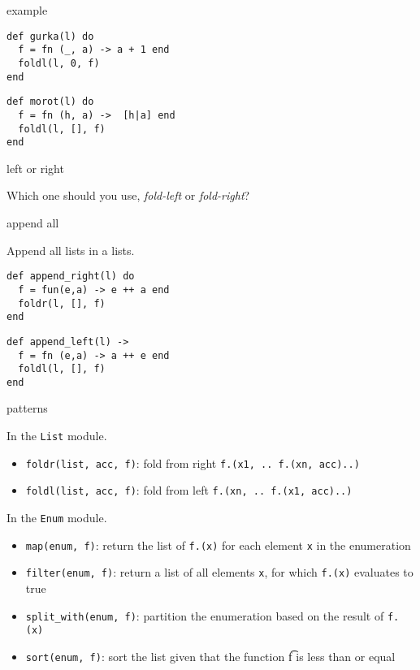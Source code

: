 \begin{frame}[fragile]{example}

\pause\vspace{10pt}
\begin{verbatim}
def gurka(l) do
  f = fn (_, a) -> a + 1 end
  foldl(l, 0, f)
end
\end{verbatim}
\pause 
\begin{verbatim}
def morot(l) do
  f = fn (h, a) ->  [h|a] end
  foldl(l, [], f)
end
\end{verbatim}
\end{frame}

\begin{frame}{left or right}

Which one should you use, {\em fold-left} or {\em fold-right}?

\end{frame}

\begin{frame}[fragile]{append all}

\pause Append all lists in a lists.

\vspace{20pt}

\begin{verbatim}
def append_right(l) do
  f = fun(e,a) -> e ++ a end
  foldr(l, [], f)
end
\end{verbatim}
\pause
\begin{verbatim}
def append_left(l) ->
  f = fn (e,a) -> a ++ e end
  foldl(l, [], f)
end
\end{verbatim}

\end{frame}



\begin{frame}{patterns}

In the {\tt List} module. 

\begin{itemize}
\item {\tt foldr(list, acc, f)}: fold from right  {\tt f.(x1, .. f.(xn, acc)..) }
\item {\tt foldl(list, acc, f)}: fold from left  {\tt f.(xn, .. f.(x1, acc)..) }
\end{itemize}

\vspace{10pt}\pause
In the {\tt Enum} module. 
\begin{itemize}
\item {\tt map(enum, f)}: return the list of {\tt f.(x)} for each element {\tt x} in the enumeration
\pause 
\item {\tt filter(enum, f)}: return a list of all elements {\tt x}, for which {\tt f.(x)} evaluates to true
\pause
\item {\tt split_with(enum, f)}: partition the enumeration based on the result of  {\tt f.(x)}
\pause
\item {\tt sort(enum, f)}: sort the list given that the function {\t f} is less than or equal
\end{itemize}

\end{frame}


